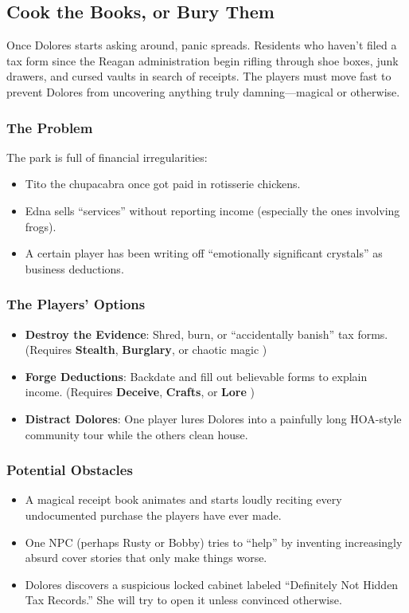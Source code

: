 \begin{multicols}{2}


\subsection{Cook the Books, or Bury Them}

Once Dolores starts asking around, panic spreads. Residents who haven’t filed a tax form since the Reagan administration begin rifling through shoe boxes, junk drawers, and cursed vaults in search of receipts. The players must move fast to prevent Dolores from uncovering anything truly damning—magical or otherwise.

\subsubsection*{The Problem}
The park is full of financial irregularities:
\begin{itemize}
    \item Tito the chupacabra once got paid in rotisserie chickens.
    \item Edna sells “services” without reporting income (especially the ones involving frogs).
    \item A certain player has been writing off “emotionally significant crystals” as business deductions.
\end{itemize}

\subsubsection*{The Players’ Options}
\begin{itemize}
    \item \textbf{Destroy the Evidence}: Shred, burn, or “accidentally banish” tax forms. (Requires \textbf{Stealth}, \textbf{Burglary}, or chaotic magic )
    \item \textbf{Forge Deductions}: Backdate and fill out believable forms to explain income. (Requires \textbf{Deceive}, \textbf{Crafts}, or \textbf{Lore} )
    \item \textbf{Distract Dolores}: One player lures Dolores into a painfully long HOA-style community tour while the others clean house.
\end{itemize}

\subsubsection*{Potential Obstacles}
\begin{itemize}
    \item A magical receipt book animates and starts loudly reciting every undocumented purchase the players have ever made.
    \item One NPC (perhaps Rusty or Bobby) tries to “help” by inventing increasingly absurd cover stories that only make things worse.
    \item Dolores discovers a suspicious locked cabinet labeled “Definitely Not Hidden Tax Records.” She will try to open it unless convinced otherwise.
\end{itemize}


\end{multicols}
